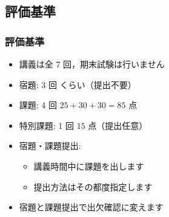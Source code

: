\subsection{評価基準}
\begin{frame}
\frametitle{評価基準}
  \begin{itemize}
\item 講義は全 7 回，期末試験は行いません
\item 宿題: 3 回 くらい（提出不要）
\item 課題: 4 回 \(25+30+30=85\) 点
\item 特別課題: 1 回 \(15\) 点（提出任意）
\item 宿題・課題提出: 
    \begin{itemize}
\item 講義時間中に課題を出します
\item 提出方法はその都度指定します
    \end{itemize}
\item 宿題と課題提出で出欠確認に変えます
  \end{itemize}
\end{frame}
%
%
